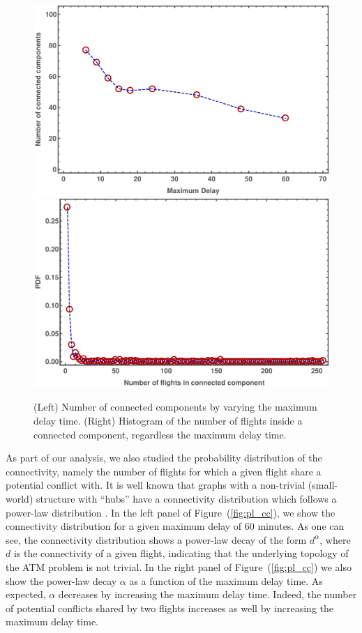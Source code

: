 \begin{figure}[t!]
\includegraphics[width=\columnwidth]{pics/instances/num_cc.pdf}
\includegraphics[width=\columnwidth]{pics/instances/analysis_cc.pdf}
\caption{(Left) Number of connected components by varying
  the maximum delay time. (Right) Histogram of the number of flights inside a
  connected component, regardless the maximum delay time.}
\label{fig:hist_cc}
\end{figure}

As part of our analysis, we also studied the probability
distribution of the connectivity, namely the number of flights
for which a given flight share a potential conflict with. It is well known that
graphs with a non-trivial (small-world) structure with ``hubs'' have a
connectivity distribution which follows a power-law distribution
\cite{barabasi:99}. In the left panel of Figure~(\ref{fig:pl_cc}), we show the
connectivity distribution for a given maximum delay of $60$ minutes. As one can
see, the connectivity distribution shows a power-law decay of the form
$d^\alpha$, where $d$ is the connectivity of a given flight, indicating that 
the underlying topology of the ATM problem is not trivial. In the right panel of
Figure~(\ref{fig:pl_cc}) we also show the power-law decay $\alpha$ as a function
of the maximum delay time. As expected, $\alpha$ decreases by increasing the
maximum delay time. Indeed, the number of potential conflicts shared by two flights
increases as well by increasing the maximum delay time.\\


